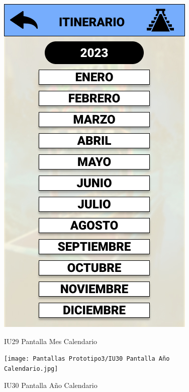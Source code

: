 \begin{figure}[h]
    \begin{minipage}{0.5\textwidth}
        \centering
        \includegraphics[width=.7\linewidth]{Pantallas Prototipo3/IU29 Pantalla Mes Calendario.jpg}
        \caption{IU29 Pantalla Mes Calendario}
    \end{minipage}
    
    \begin{minipage}{0.5\textwidth}
        \centering
        \texttt{[image: Pantallas Prototipo3/IU30 Pantalla Año Calendario.jpg]}
        \caption{IU30 Pantalla Año Calendario}
    \end{minipage}%
\end{figure}


